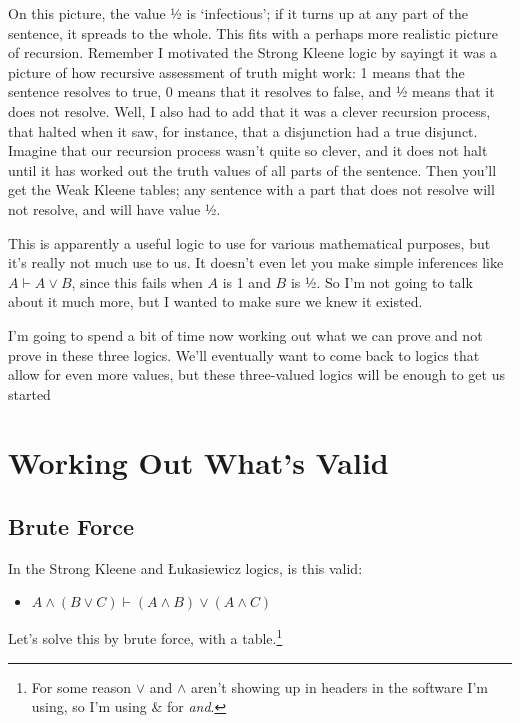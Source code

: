 \documentclass[
]{article}
\providecommand{\tightlist}{%
  \setlength{\itemsep}{0pt}\setlength{\parskip}{0pt}}\usepackage{longtable,booktabs,array}
\begin{document}
On this picture, the value ½ is `infectious'; if it turns up at any part
of the sentence, it spreads to the whole. This fits with a perhaps more
realistic picture of recursion. Remember I motivated the Strong Kleene
logic by sayingt it was a picture of how recursive assessment of truth
might work: 1 means that the sentence resolves to true, 0 means that it
resolves to false, and ½ means that it does not resolve. Well, I also
had to add that it was a clever recursion process, that halted when it
saw, for instance, that a disjunction had a true disjunct. Imagine that
our recursion process wasn't quite so clever, and it does not halt until
it has worked out the truth values of all parts of the sentence. Then
you'll get the Weak Kleene tables; any sentence with a part that does
not resolve will not resolve, and will have value ½.

This is apparently a useful logic to use for various mathematical
purposes, but it's really not much use to us. It doesn't even let you
make simple inferences like \(A \vdash A \vee B\), since this fails when
\(A\) is 1 and \(B\) is ½. So I'm not going to talk about it much more,
but I wanted to make sure we knew it existed.

I'm going to spend a bit of time now working out what we can prove and
not prove in these three logics. We'll eventually want to come back to
logics that allow for even more values, but these three-valued logics
will be enough to get us started

\hypertarget{working-out-whats-valid}{%
\section{Working Out What's Valid}\label{working-out-whats-valid}}

\hypertarget{brute-force}{%
\subsection{Brute Force}\label{brute-force}}

In the Strong Kleene and Łukasiewicz logics, is this valid:

\begin{itemize}
\tightlist
\item
  \(A \wedge (B \vee C) \vdash (A \wedge B) \vee (A \wedge C)\)
\end{itemize}

Let's solve this by brute force, with a table.\footnote{For some reason
  \(\vee\) and \(\wedge\) aren't showing up in headers in the software
  I'm using, so I'm using \& for \emph{and}.}
\end{document}

